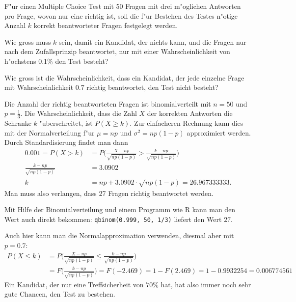 F"ur einen Multiple Choice Test mit 50 Fragen mit drei m"oglichen Antworten
pro Frage, wovon nur eine richtig ist, soll die f"ur
Bestehen des Testes n"otige Anzahl $k$ korrekt beantworteter Fragen
festgelegt werden.
\begin{teilaufgaben}
\item Wie gross muss $k$ sein, damit ein Kandidat,
der nichts kann, und die Fragen nur nach dem Zufallsprinzip beantwortet,
nur mit einer Wahrscheinlichkeit von h"ochstens 0.1\% den Test besteht?
\item Wie gross ist die Wahrscheinlichkeit, dass ein Kandidat, der jede
einzelne Frage mit Wahrscheinlichkeit $0.7$ richtig beantwortet, den
Test nicht besteht?
\end{teilaufgaben}

\begin{loesung}
\begin{teilaufgaben}
\item Die Anzahl der richtig beantworteten Fragen ist binomialverteilt
mit $n=50$ und $p=\frac13$. Die Wahrscheinlichkeit, dass die Zahl $X$
der korrekten Antworten die Schranke $k$ "uberschreitet, ist $P(X\ge k)$.
Zur einfacheren Rechnung kann dies mit der Normalverteilung f"ur
$\mu = np$ und $\sigma^2=np(1-p)$ approximiert werden. Durch Standardisierung
findet man dann
\begin{align*}
0.001=P(X>k)
&=
P\biggl(
\frac{X-np}{\sqrt{np(1-p)}}>\frac{k-np}{\sqrt{np(1-p)}}
\biggr)
\\
\frac{k-np}{\sqrt{np(1-p)}}&=3.0902
\\
k&= np+3.0902\cdot \sqrt{np(1-p)}
=26.967333333.
\end{align*}
Man muss also verlangen, dass 27 Fragen richtig beantwortet werden.

Mit Hilfe der Binomialverteilung und einem Programm wie R kann man den
Wert auch direkt bekommen:
\texttt{qbinom(0.999, 50, 1/3)}
liefert den Wert $27$.
\item
Auch hier kann man die Normalapproximation verwenden, diesmal aber mit
$p=0.7$:
\begin{align*}
P(X\le k)&=
P\biggl(
\frac{X-np}{\sqrt{np(1-p)}}\le\frac{k-np}{\sqrt{np(1-p)}}
\biggr)
\\
&=F\biggl(
\frac{k-np}{\sqrt{np(1-p)}}
\biggr)
=F(-2.469)=1-F(2.469)=1-0.9932254=0.006774561
\end{align*}
Ein Kandidat, der nur eine Treffsicherheit von $70\%$ hat, hat also
immer noch sehr gute Chancen, den Test zu bestehen.
\qedhere
\end{teilaufgaben}
\end{loesung}

